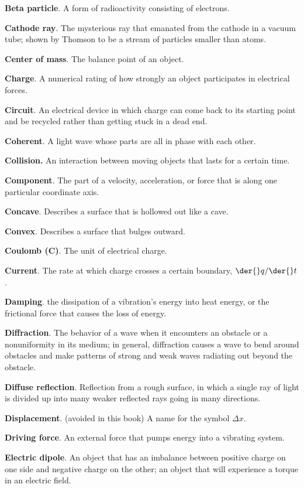 \textbf{Beta particle}. A form of radioactivity consisting of electrons. 

\textbf{Cathode ray}. The mysterious ray that emanated from the cathode in a vacuum tube; shown by Thomson to
be a stream of particles smaller than atoms. 

\textbf{Center of mass}. The balance point of an object. 

\textbf{Charge}. A numerical rating of how strongly an object participates in electrical forces. 

\textbf{Circuit}. An electrical device in which charge can come back to its starting point and be recycled
rather than getting stuck in a dead end. 

\textbf{Coherent}. A light wave whose parts are all in phase with each other. 

\textbf{Collision.}	An interaction between moving objects that lasts for a certain time.

\textbf{Component}. The part of a velocity, acceleration, or force that is along one particular coordinate
axis. 

\textbf{Concave}. Describes a surface that is hollowed out like a cave. 

\textbf{Convex}. Describes a surface that bulges outward. 

\textbf{Coulomb (C)}. The unit of electrical charge. 

\textbf{Current}. The rate at which charge crosses a certain boundary, $\der{}q/\der{}t$. 

\textbf{Damping}. the dissipation of a vibration's energy into heat energy, or the frictional force that
causes the loss
of energy.

\textbf{Diffraction}. The behavior of a wave when it encounters an obstacle or a nonuniformity in its medium;
in general, diffraction causes a wave to bend around obstacles and make patterns of strong and weak waves
radiating out beyond the obstacle. 

\textbf{Diffuse reflection}. Reflection from a rough surface, in which a single ray of light is divided up
into many weaker reflected rays going in many directions. 

\textbf{Displacement}. (avoided in this book) A name for the symbol $\Delta{}x$. 

\textbf{Driving force}. An external force that pumps energy into a vibrating system.

\textbf{Electric dipole}. An object that has an imbalance between positive charge on one side and negative
charge on the other; an object that will experience a torque in an electric field. 

